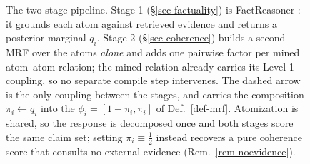 \begin{figure}[htbp]
{}
\ifdefined\plnocaption\else
\caption{The two-stage pipeline. Stage 1 (\S\ref{sec-factuality}) is FactReasoner
  \citep{factreasoner}: it grounds each atom against retrieved evidence and returns a
  posterior marginal $q_i$. Stage 2 (\S\ref{sec-coherence}) builds a second MRF over
  the atoms \emph{alone} and adds one pairwise factor per mined atom--atom relation;
  the mined relation already carries its Level-1 coupling, so no separate compile step
  intervenes. The dashed arrow is the only coupling between the stages, and carries
  the composition $\pi_i\!\gets\!q_i$ into the $\phi_i=[1-\pi_i,\pi_i]$ of
  Def.~\ref{def-mrf}. Atomization is shared, so the response is decomposed once and
  both stages score the same claim set; setting $\pi_i\!\equiv\!\tfrac12$ instead
  recovers a pure coherence score that consults no external evidence
  (Rem.~\ref{rem-noevidence}).}
\label{fig:pipeline}
\fi
\end{figure}
